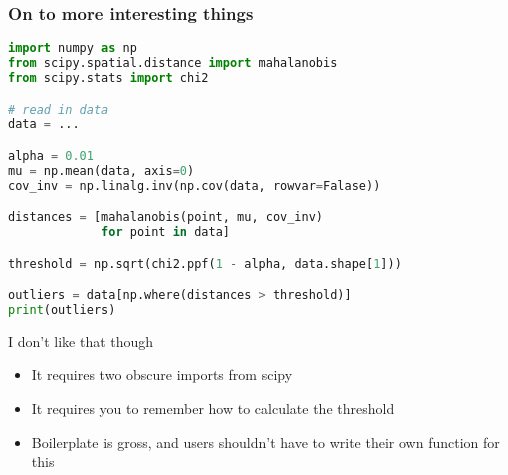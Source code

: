 \documentclass[9pt, dvipsnames]{beamer}
\begin{document}
\begin{frame}[fragile=singleslide]\frametitle{On to more interesting things\textellipsis}
    \begin{lstlisting}[language=python]
import numpy as np
from scipy.spatial.distance import mahalanobis
from scipy.stats import chi2

# read in data
data = ...

alpha = 0.01
mu = np.mean(data, axis=0)
cov_inv = np.linalg.inv(np.cov(data, rowvar=Falase))

distances = [mahalanobis(point, mu, cov_inv)
             for point in data]

threshold = np.sqrt(chi2.ppf(1 - alpha, data.shape[1]))

outliers = data[np.where(distances > threshold)]
print(outliers)
    \end{lstlisting}
\end{frame}

\begin{frame}{I don't like that though \textellipsis}
    \begin{itemize}
        \item It requires two obscure imports from scipy
        \item It requires you to remember how to calculate the threshold
        \item Boilerplate is gross, and users shouldn't have to write their own function for this
    \end{itemize}
\end{frame}
\end{document}
